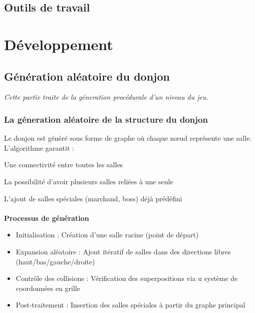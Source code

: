 \documentclass[a4paper,11pt]{article}
\begin{document}
\subsection{Outils de travail}


\newpage
\section{Développement}

\subsection{Génération aléatoire du donjon}
\textit{Cette partie traite de la géneration procédurale d'un niveau du jeu.}
\subsubsection{La géneration aléatoire de la structure du donjon}

Le donjon est généré sous forme de graphe où chaque nœud représente une salle. L'algorithme garantit :

    Une connectivité entre toutes les salles

    La possibilité d'avoir plusieurs salles reliées à une seule

    L'ajout de salles spéciales (marchand, boss) déjà prédéfini 
\\\\
\textbf{Processus de génération}
\begin{itemize}
    \item Initialisation : Création d'une salle racine (point de départ)
    \item Expansion aléatoire : Ajout itératif de salles dans des directions libres (haut/bas/gauche/droite)
    \item Contrôle des collisions : Vérification des superpositions via u système de coordonnées en grille
    \item Post-traitement : Insertion des salles spéciales à partir du graphe principal
\end{itemize}
\end{document}
